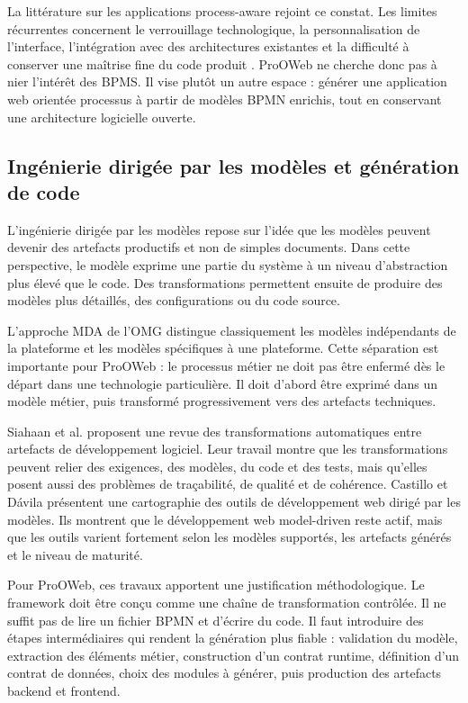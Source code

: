 \documentclass[12pt,a4paper]{article}
\begin{document}
La littérature sur les applications process-aware rejoint ce constat. Les limites récurrentes concernent le verrouillage technologique, la personnalisation de l'interface, l'intégration avec des architectures existantes et la difficulté à conserver une maîtrise fine du code produit \cite{neto2022}. ProOWeb ne cherche donc pas à nier l'intérêt des BPMS. Il vise plutôt un autre espace : générer une application web orientée processus à partir de modèles BPMN enrichis, tout en conservant une architecture logicielle ouverte.

\subsection{Ingénierie dirigée par les modèles et génération de code}

L'ingénierie dirigée par les modèles repose sur l'idée que les modèles peuvent devenir des artefacts productifs et non de simples documents. Dans cette perspective, le modèle exprime une partie du système à un niveau d'abstraction plus élevé que le code. Des transformations permettent ensuite de produire des modèles plus détaillés, des configurations ou du code source.

L'approche MDA de l'OMG \cite{omgMda} distingue classiquement les modèles indépendants de la plateforme et les modèles spécifiques à une plateforme. Cette séparation est importante pour ProOWeb : le processus métier ne doit pas être enfermé dès le départ dans une technologie particulière. Il doit d'abord être exprimé dans un modèle métier, puis transformé progressivement vers des artefacts techniques.

Siahaan et al. \cite{siahaan2024} proposent une revue des transformations automatiques entre artefacts de développement logiciel. Leur travail montre que les transformations peuvent relier des exigences, des modèles, du code et des tests, mais qu'elles posent aussi des problèmes de traçabilité, de qualité et de cohérence. Castillo et Dávila \cite{castillo2024} présentent une cartographie des outils de développement web dirigé par les modèles. Ils montrent que le développement web model-driven reste actif, mais que les outils varient fortement selon les modèles supportés, les artefacts générés et le niveau de maturité.

Pour ProOWeb, ces travaux apportent une justification méthodologique. Le framework doit être conçu comme une chaîne de transformation contrôlée. Il ne suffit pas de lire un fichier BPMN et d'écrire du code. Il faut introduire des étapes intermédiaires qui rendent la génération plus fiable : validation du modèle, extraction des éléments métier, construction d'un contrat runtime, définition d'un contrat de données, choix des modules à générer, puis production des artefacts backend et frontend.
\end{document}
